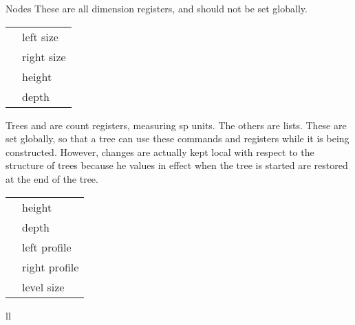 \documentclass[11pt,english,BCOR10mm,DIV12,bibliography=totoc,parskip=false,smallheadings
    headexclude,footexclude,oneside]{pst-doc}
\begin{document}
\begin{compactdesc}
\item[Nodes] These are all dimension registers, and should not be set globally.\label{nodesizes}
\begin{center}
\begin{tabular}{ll}
 \Ldim{pst@dima} & left size\\
 \Ldim{pst@dimb} & right size\\
 \Ldim{pst@dimc} & height\\
 \Ldim{pst@dimd} & depth
\end{tabular}
\end{center}

\item[Trees]
 and  are count registers, measuring sp units. The others are lists. These are 
set globally, so that a tree can use these commands and registers while it is being constructed. However, 
changes are actually kept local with respect to the structure of trees because he values in effect when 
the tree is started are restored at the end of the tree.
\begin{center}
\begin{tabular}{ll}
 \Ldim{PTR@height}        & height\\
 \Ldim{PTR@depth}         & depth\\
 \Lcs{PTR@leftprofile}   & left profile\\
 \Lcs{PTR@rightprofile}  & right profile\\
 \Lcs{PTR@levelsizes}    & level size
\end{tabular}{ll}
\end{center}
\end{compactdesc}
\end{document}
